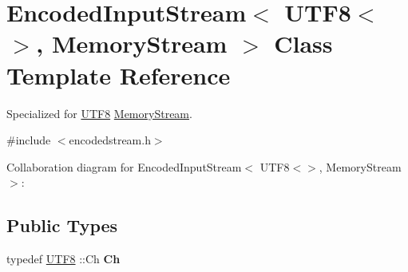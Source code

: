 \hypertarget{class_encoded_input_stream_3_01_u_t_f8_3_4_00_01_memory_stream_01_4}{}\section{Encoded\+Input\+Stream$<$ U\+T\+F8$<$$>$, Memory\+Stream $>$ Class Template Reference}
\label{class_encoded_input_stream_3_01_u_t_f8_3_4_00_01_memory_stream_01_4}


Specialized for \hyperlink{struct_u_t_f8}{U\+T\+F8} \hyperlink{struct_memory_stream}{Memory\+Stream}.  




{\ttfamily \#include $<$encodedstream.\+h$>$}



Collaboration diagram for Encoded\+Input\+Stream$<$ U\+T\+F8$<$$>$, Memory\+Stream $>$\+:
\subsection*{Public Types}
\begin{DoxyCompactItemize}
\item 
\mbox{\label{class_encoded_input_stream_3_01_u_t_f8_3_4_00_01_memory_stream_01_4_a091eb31dd2554bf10054148953f9b3bf}} 
typedef \hyperlink{struct_u_t_f8}{U\+T\+F8} \+::Ch {\bfseries Ch}
\end{DoxyCompactItemize}
